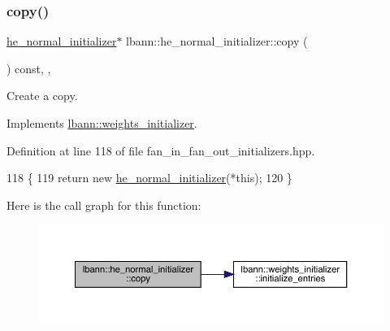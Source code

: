 \subsubsection{\texorpdfstring{copy()}{copy()}}
{\footnotesize\ttfamily \hyperlink{classlbann_1_1he__normal__initializer}{he\+\_\+normal\+\_\+initializer}$\ast$ lbann\+::he\+\_\+normal\+\_\+initializer\+::copy (\begin{DoxyParamCaption}{ }\end{DoxyParamCaption}) const\hspace{0.3cm}{\ttfamily [inline]}, {\ttfamily [override]}, {\ttfamily [virtual]}}

Create a copy. 

Implements \hyperlink{classlbann_1_1weights__initializer_acc84ce49188b74b23987cef3db18525a}{lbann\+::weights\+\_\+initializer}.



Definition at line 118 of file fan\+\_\+in\+\_\+fan\+\_\+out\+\_\+initializers.\+hpp.


\begin{DoxyCode}
118                                                \{
119     \textcolor{keywordflow}{return} \textcolor{keyword}{new} \hyperlink{classlbann_1_1he__normal__initializer_a959fc0dcf16250291142a3fc308cfc03}{he\_normal\_initializer}(*\textcolor{keyword}{this});
120   \}
\end{DoxyCode}
Here is the call graph for this function\+:\nopagebreak
\begin{figure}[H]
\begin{center}
\leavevmode
\includegraphics[width=350pt]{classlbann_1_1he__normal__initializer_af71916bbf87c6d34fb701c79fa6237bf_cgraph}
\end{center}
\end{figure}
\mbox{\label{classlbann_1_1he__normal__initializer_a01d283880fc0c1b743bcc89e732f4e15}} 

